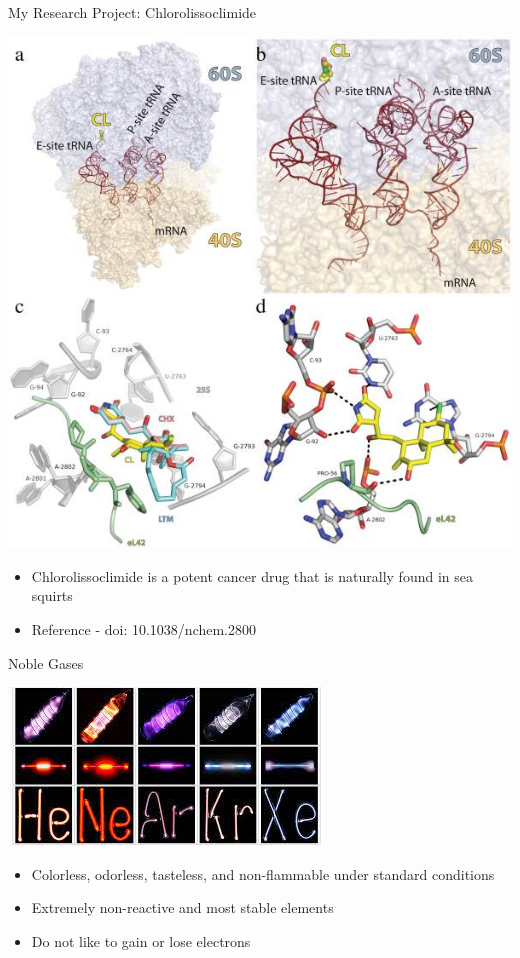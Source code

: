 \documentclass[11pt]{beamer}
\begin{document}
\begin{frame}{My Research Project: Chlorolissoclimide}
  \begin{center}
    \includegraphics[trim={0 4.2in 0 0},clip,scale=0.45]{lisso_drug}
  \end{center}

  \begin{itemize}
  \item Chlorolissoclimide is a potent cancer drug that
    is naturally found in sea squirts
  \item Reference - doi: 10.1038/nchem.2800
  \end{itemize}
\end{frame}

\begin{frame}{Noble Gases}
  \begin{center}
    \includegraphics[scale=0.7]{neon_lights}
  \end{center}
  
  \begin{itemize}
  \item Colorless, odorless, tasteless, and non-flammable
    under standard conditions
  \item Extremely non-reactive and most stable elements
  \item Do not like to gain or lose electrons
  \end{itemize}
\end{frame}
\end{document}
